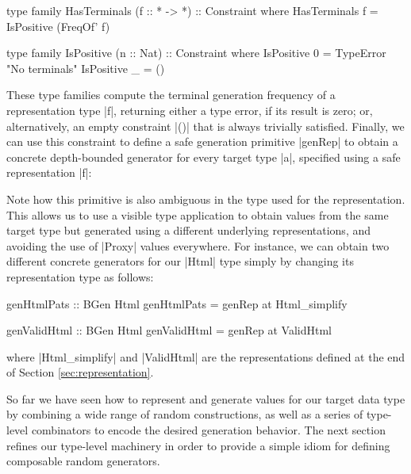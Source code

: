 \begin{code}
type family HasTerminals (f :: * -> *) :: Constraint where
  HasTerminals f = IsPositive (FreqOf' f)

type family IsPositive (n :: Nat) :: Constraint where
  IsPositive 0 = TypeError "No terminals"
  IsPositive _ = ()
\end{code}
%
These type families compute the terminal generation frequency of a
representation type |f|, returning either a type error, if its result is zero;
or, alternatively, an empty constraint |()| that is always trivially satisfied.
%
Finally, we can use this constraint to define a safe generation primitive
|genRep| to obtain a concrete depth-bounded generator for every target type |a|,
specified using a safe representation |f|:

%
Note how this primitive is also ambiguous in the type used for the
representation.
%
This allows us to use a visible type application to obtain values from the same
target type but generated using a different underlying representations, and
avoiding the use of |Proxy| values everywhere.
%
For instance, we can obtain two different concrete generators for our |Html|
type simply by changing its representation type as follows:

\begin{code}
genHtmlPats :: BGen Html
genHtmlPats = genRep at Html_simplify

genValidHtml :: BGen Html
genValidHtml = genRep  at ValidHtml
\end{code}
%
where |Html_simplify| and |ValidHtml| are the representations defined at the end
of Section \ref{sec:representation}.


%
So far we have seen how to represent and generate values for our target data
type by combining a wide range of random constructions, as well as a series of
type-level combinators to encode the desired generation behavior.
%
The next section refines our type-level machinery in order to provide a simple
idiom for defining composable random generators.

